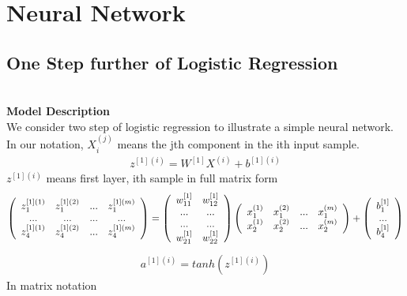 \documentclass[a4paper]{article}
\begin{document}
\section{Neural Network}
\subsection{One Step further of Logistic Regression}\\
{\bf Model Description}\\
We consider two step of logistic regression to illustrate a simple neural network. In our notation, $X_i^{(j)}$ means the jth component in the ith input sample.
\begin{align*}
	z^{[1](i)} = W^{[1]} X^{(i)} + b^{[1](i)}
\end{align*}
 $z^{[1](i)}$ means first layer, ith sample
in full matrix form
\begin{align*}
\left( \begin{array} {c c c c}
z_1^{[1](1)} & z_1^{[1](2)} & ... & z_1^{[1](m)} \\
... & ... & ... & ... \\
z_4^{[1](1)} & z_4^{[1](2)} & ... & z_4^{[1](m)} \\
\end{array} \right)
=\left( \begin{array} {c c}
w_{11}^{[1]} & w_{12}^{[1]}   \\
... & ... \\
... & ... \\
w_{21}^{[1]} & w_{22}^{[1]}   \\
\end{array} \right)
\left( \begin{array} {c c c c}
x_1^{(1)} & x_1^{(2)} & ... & x_1^{(m)} \\
x_2^{(1)} & x_2^{(2)} & ... & x_2^{(m)} \\
\end{array} \right)
+
\left( \begin{array} {c}
b_1^{[1]}  \\
...  \\
b_4^{[1]}  \\
\end{array} \right)
\end{align*}
\begin{align*}
	a^{[1](i)} = tanh(z^{[1](i)})
\end{align*}
In matrix notation
\end{document}
